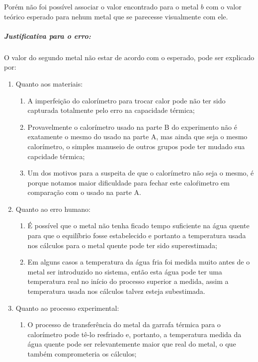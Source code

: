 \documentclass[a4paper]{article}
\begin{document}
				Porém não foi possível associar o valor encontrado para o metal $b$
				com o valor teórico esperado para nehum metal que se parecesse visualmente
				com ele. 


				\subparagraph{Justificativa para o erro:}

				O valor do segundo metal não estar de acordo com o esperado, pode
				ser explicado por:
				\begin{enumerate}
					\item Quanto aos materiais:
					\begin{enumerate}
						\item A imperfeição do calorímetro para trocar calor pode
						não ter sido capturada totalmente pelo erro na capacidade 
						térmica; 
						\item Provavelmente o calorímetro usado na parte B do 
						experimento não é exatamente o mesmo do usado na parte A, 
						mas ainda que seja o mesmo calorímetro, o simples manuseio 
						de outros grupos pode ter mudado sua capcidade térmica;
						\item Um dos motivos para a suspeita de que o calorímetro 
						não seja o mesmo, é porque notamos maior dificuldade para 
						fechar este caloŕimetro em comparação com o usado na parte A.
					\end{enumerate}
					\item Quanto ao erro humano:
					\begin{enumerate}
						\item É possível que o metal não tenha ficado tempo 
						suficiente na água quente para que o equilíbrio fosse 
						estabelecido e portanto a temperatura usada nos cálculos 
						para o metal quente pode ter sido superestimada;
						\item Em alguns casos a temperatura da água fria foi 
						medida muito antes de o metal ser introduzido no sistema, 
						então esta água pode ter uma temperatura real no início do 
						processo superior a medida, assim a temperatura usada nos cálculos talvez esteja subestimada.
					\end{enumerate}
					\item Quanto ao processo experimental:
					\begin{enumerate}
						\item O processo de transferência do metal da garrafa 
						térmica para o calorímetro pode tê-lo resfriado e, 
						portanto, a temperatura medida da água quente pode ser 
						relevantemente maior que real do metal, o que também comprometeria os cálculos;

\end{enumerate}
\end{enumerate}
\end{document}
